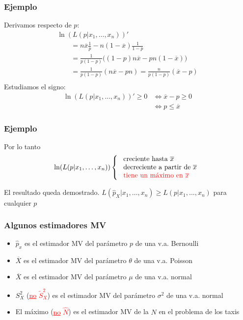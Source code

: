 \documentclass[12pt,t]{beamer}\usepackage[]{graphicx}\usepackage[]{color}
\newcommand{\red}[1]{\textcolor{red}{#1}}
\renewcommand{\leq}{\leqslant}
\renewcommand{\geq}{\geqslant}
\theoremstyle{plain}
\theoremstyle{definition}
\begin{document}
\begin{frame}
\frametitle{Ejemplo}
Derivamos respecto de $p$:
$$
\begin{array}{l}
\ln(L(p|x_1,\ldots,x_n))'\\
\qquad \displaystyle=n\overline{x}\frac{1}{p}-n(1-\overline{x})\frac{1}{1-p}\\
\qquad \displaystyle=\frac{1}{p(1-p)}\Big((1-p)n\overline{x}-pn(1-\overline{x})\Big)\\
\qquad \displaystyle=\frac{1}{p(1-p)}(n\overline{x} -pn)=\frac{n}{p(1-p)}(\overline{x} -p)\\
\end{array}
$$
Estudiamos el signo:
$$
\begin{array}{rl}
\ln(L(p|x_1,\ldots,x_n))'\geq 0 &\displaystyle \Leftrightarrow \overline{x} -p\geq 0\\ &\displaystyle \Leftrightarrow
p\leq\overline{x}
\end{array}
$$
\end{frame}

\begin{frame}
\frametitle{Ejemplo}
Por lo tanto
$$
\ln(L(p|x_1,\ldots,x_n))\left\{
\begin{array}{l}
\mbox{ creciente hasta $\overline{x}$}\\
\mbox{ decreciente a partir de $\overline{x}$}\\
\mbox{ \red{tiene un máximo en $\overline{x}$}}
\end{array}\right.
$$

\vspace{1cm}

El resultado queda demostrado. $L(\widehat{p}_X|x_1,\ldots,x_n)\geq L(p|x_1,\ldots,x_n)$ para  cualquier  $p$
\end{frame}

\begin{frame}
\frametitle{Algunos estimadores MV}
\vspace*{-1ex}

\begin{itemize}
\item $\widehat{p}_x$ es el estimador MV del parámetro  $p$ de una v.a. Bernoulli
\medskip

\item $\overline{X}$  es el estimador MV del parámetro  $\theta$ de una v.a. Poisson
\medskip

\item $\overline{X}$  es el estimador MV del parámetro  $\mu$ de una v.a. normal
\medskip

\item $S_X^2$ (\red{\underline{no} $\widetilde{S}_X^2$}) es el estimador MV  del parámetro  $\sigma^2$ de una v.a. normal
\medskip

\item El máximo (\red{\underline{no}  $\widehat{N}$}) es el estimador MV de la $N$ en el  problema de los taxis

\end{itemize}

\end{frame}
\end{document}
